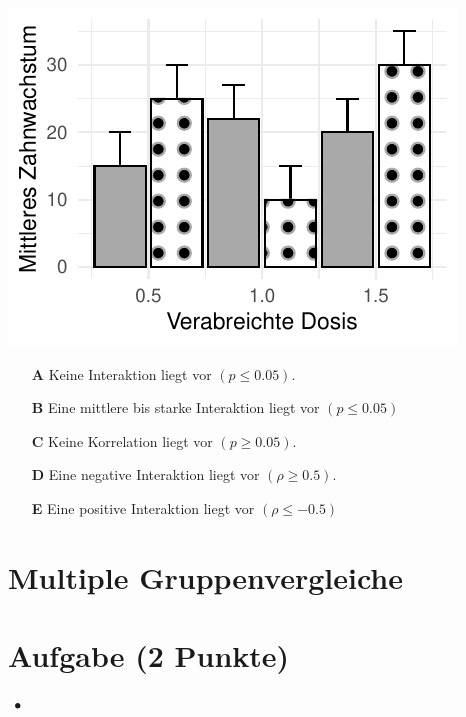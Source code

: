 \documentclass[a4paper, 9pt]{scrartcl}\usepackage[]{graphicx}\usepackage[]{xcolor}
\makeatletter
\def\maxwidth{ %
  \ifdim\Gin@nat@width>\linewidth
    \linewidth
  \else
    \Gin@nat@width
  \fi
}
\makeatother
\begin{document}
{\centering \includegraphics[width=\maxwidth]{img/mc-anova-02-a-1} 

}







\begin{enumerate}
\item [\textbf{A} \msquare] Keine Interaktion liegt vor $(p \leq 0.05)$.
\item [\textbf{B} \msquare] Eine mittlere bis starke Interaktion liegt vor $(p \leq 0.05)$
\item [\textbf{C} \msquare] Keine Korrelation liegt vor $(p \geq 0.05)$.
\item [\textbf{D} \msquare] Eine negative Interaktion liegt vor $(\rho \geq 0.5)$.
\item [\textbf{E} \msquare] Eine positive Interaktion liegt vor $(\rho \leq -0.5)$ 
\end{enumerate}
\section*{Multiple Gruppenvergleiche} 

\section{Aufgabe \hfill (2 Punkte)}

\ifcollection
\begin{flushright}
\tiny\vspace{-2Ex}
\textbf{\examinhaltstart}
\exammodulestatversuch $\;\bullet$
\exammodulebiostat
\vspace{-1Ex}
\end{flushright}
\fi
\end{document}

